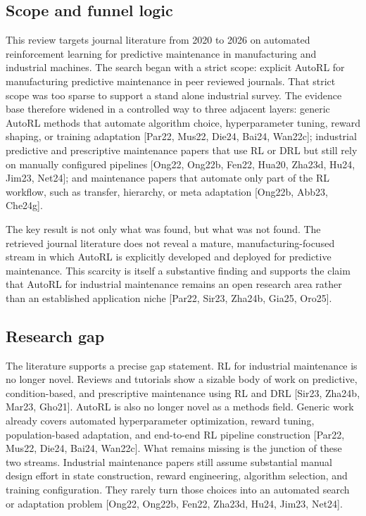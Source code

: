 \subsection{Scope and funnel logic}

This review targets journal literature from 2020 to 2026 on automated reinforcement learning for predictive maintenance in manufacturing and industrial machines. The search began with a strict scope: explicit AutoRL for manufacturing predictive maintenance in peer reviewed journals. That strict scope was too sparse to support a stand alone industrial survey. The evidence base therefore widened in a controlled way to three adjacent layers: generic AutoRL methods that automate algorithm choice, hyperparameter tuning, reward shaping, or training adaptation [Par22, Mus22, Die24, Bai24, Wan22c]; industrial predictive and prescriptive maintenance papers that use RL or DRL but still rely on manually configured pipelines [Ong22, Ong22b, Fen22, Hua20, Zha23d, Hu24, Jim23, Net24]; and maintenance papers that automate only part of the RL workflow, such as transfer, hierarchy, or meta adaptation [Ong22b, Abb23, Che24g].

The key result is not only what was found, but what was not found. The retrieved journal literature does not reveal a mature, manufacturing-focused stream in which AutoRL is explicitly developed and deployed for predictive maintenance. This scarcity is itself a substantive finding and supports the claim that AutoRL for industrial maintenance remains an open research area rather than an established application niche [Par22, Sir23, Zha24b, Gia25, Oro25].

\subsection{Research gap}

The literature supports a precise gap statement. RL for industrial maintenance is no longer novel. Reviews and tutorials show a sizable body of work on predictive, condition-based, and prescriptive maintenance using RL and DRL [Sir23, Zha24b, Mar23, Gho21]. AutoRL is also no longer novel as a methods field. Generic work already covers automated hyperparameter optimization, reward tuning, population-based adaptation, and end-to-end RL pipeline construction [Par22, Mus22, Die24, Bai24, Wan22c]. What remains missing is the junction of these two streams. Industrial maintenance papers still assume substantial manual design effort in state construction, reward engineering, algorithm selection, and training configuration. They rarely turn those choices into an automated search or adaptation problem [Ong22, Ong22b, Fen22, Zha23d, Hu24, Jim23, Net24].

